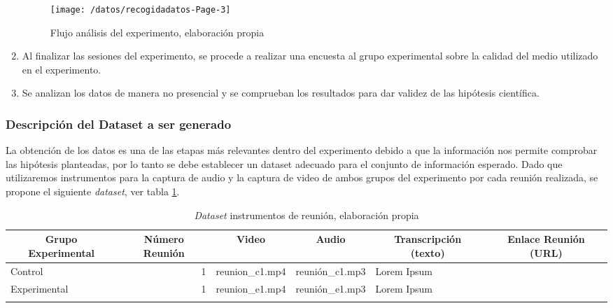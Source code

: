 \begin{enumerate}[1.]
\begin{figure}[!h]
\centering
\texttt{[image: /datos/recogidadatos-Page-3]}
\caption{Flujo análisis del experimento,  elaboración propia} 
\label{img5-4}
\end{figure}

	\item Al finalizar las sesiones del experimento, se procede a realizar una encuesta al grupo experimental sobre la calidad del medio utilizado en el experimento.
	\item Se analizan los datos de manera no presencial y se comprueban los resultados para dar validez de las hipótesis científica.

\end{enumerate}

\subsubsection{Descripción del Dataset a ser generado}

La obtención de los datos es una de las etapas más relevantes dentro del experimento debido a que la información nos permite comprobar las hipótesis planteadas, por lo tanto se debe establecer un dataset adecuado para el conjunto de información esperado. Dado que utilizaremos instrumentos para la captura de audio y la captura de video de ambos grupos del experimento por cada reunión realizada, se propone el siguiente \textit{dataset}, ver tabla \ref{tab:dataset}.

\begin{table}[!h]
\centering
\caption{\textit{Dataset} instrumentos de reunión, elaboración propia}
\label{tab:dataset}
\resizebox{15cm}{!} {
\begin{tabular}{|l|r|l|l|l|l|}
\hline
\multicolumn{1}{|c|}{\textbf{Grupo Experimental}} & \multicolumn{1}{c|}{\textbf{Número Reunión}} & \multicolumn{1}{c|}{\textbf{Video}} & \multicolumn{1}{c|}{\textbf{Audio}} & \multicolumn{1}{c|}{\textbf{Transcripción (texto)}} & \multicolumn{1}{c|}{\textbf{Enlace Reunión (URL)}} \\ \hline
Control & 1 & reunion\_c1.mp4 & reunión\_c1.mp3 & Lorem Ipsum &  \\ \hline
Experimental & 1 & reunion\_e1.mp4 & reunión\_e1.mp3 & Lorem Ipsum &  \\ \hline
 &  &  &  &  &  \\ \hline
\end{tabular}
}
\end{table}

